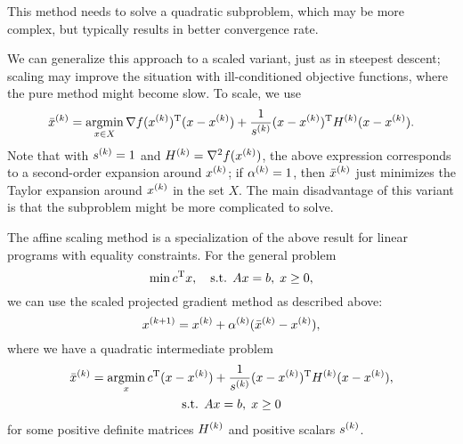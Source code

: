 \documentclass{article}
\begin{document}
This method needs to solve a quadratic subproblem, which may be more complex, but typically results
in better convergence rate.

We can generalize this approach to a scaled variant, just as in steepest descent; scaling may
improve the situation with ill-conditioned objective functions, where the pure method might become
slow.  To scale, we use
\begin{equation*}
  \kth{\bar{x}} = \argmin_{x \in X} \T{\nabla f(\kth{x})} (x - \kth{x}) +
  \frac{1}{\kth{s}} \T{(x - \kth{x})} \kth{H} (x - \kth{x}).
\end{equation*}
Note that with \(\kth{s} = 1\) and \(\kth{H} = \nabla^2 f(\kth{x})\), the above expression
corresponds to a second-order expansion around \(\kth{x}\); if \(\kth{\alpha} = 1\), then
\(\kth{\bar{x}}\) just minimizes the Taylor expansion around \(\kth{x}\) in the set \(X\).  The main
disadvantage of this variant is that the subproblem might be more complicated to solve.



\label{s:affine-scaling-method}


The affine scaling method is a specialization of the above result for linear programs with equality
constraints.  For the general problem
\begin{equation*}
  \min \T{c} x, \quad\text{s.t. } Ax = b, \; x \geq 0,
\end{equation*}
we can use the scaled projected gradient method as described above:
\begin{equation*}
  \kth[k+1]{x} = \kth{x} + \kth{\alpha}(\kth{\bar{x}} - \kth{x}),
\end{equation*}
where we have a quadratic intermediate problem
\begin{gather*}
  \kth{\bar{x}} = \argmin_x \T{c}(x - \kth{x})
  + \frac{1}{\kth{s}} \T{(x - \kth{x})} \kth{H} (x - \kth{x}),\\
  \text{s.t. } Ax = b, \; x \geq 0
\end{gather*}
for some positive definite matrices \(\kth{H}\) and positive scalars \(\kth{s}\).
\end{document}
